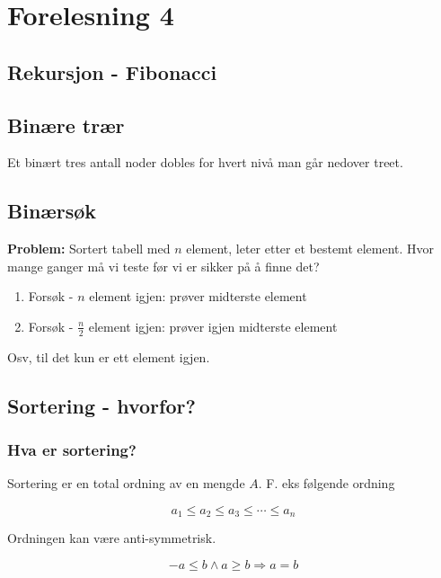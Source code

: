 \documentclass{article}
\begin{document}
    \section{Forelesning 4}

    \subsection{Rekursjon - Fibonacci}

    \subsection{Binære trær}

    Et binært tres antall noder dobles for hvert nivå man går nedover treet.

    \subsection{Binærsøk}

    \textbf{Problem:} Sortert tabell med \( n \) element, leter etter et bestemt element. Hvor mange ganger må vi teste før vi er sikker på å finne det?

    \begin{enumerate}
        \item Forsøk - \( n \) element igjen: prøver midterste element
        \item Forsøk - \( \frac{n}{2}  \) element igjen: prøver igjen midterste element
    \end{enumerate}

    Osv, til det kun er ett element igjen.

    \subsection{Sortering - hvorfor?}

    \subsubsection{Hva er sortering?}

    Sortering er en total ordning av en mengde \( A \). F. eks følgende ordning

    \[ a_{1} \leq a_{2} \leq a_{3} \leq \cdots \leq a_{n} \]

    Ordningen kan være anti-symmetrisk.

    \[ - a \leq b \wedge a \geq b \Rightarrow a = b \]
\end{document}
